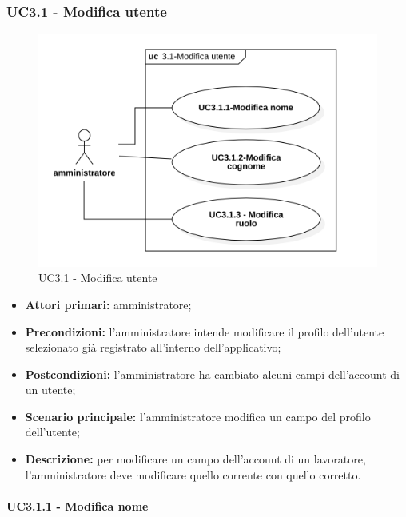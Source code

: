 \subsubsection{UC3.1 - Modifica utente}

\begin{figure}[H]
	\centering
	\includegraphics[scale=0.52]{res/images/uc3-1.png}
	\caption{UC3.1 - Modifica utente}
\end{figure}
\begin{itemize}
	\item 	\textbf{Attori primari:} amministratore;
	\item 	\textbf{Precondizioni:} l'amministratore intende modificare il profilo dell'utente selezionato già registrato all'interno dell'applicativo;
	\item 	\textbf{Postcondizioni:} l'amministratore ha cambiato alcuni campi dell'account di un utente;
	\item 	\textbf{Scenario principale:} l'amministratore modifica un campo del profilo dell'utente;
	\item 	\textbf{Descrizione:} per modificare un campo dell'account di un lavoratore, l'amministratore deve modificare quello corrente con quello corretto.

\end{itemize}

\paragraph{UC3.1.1 - Modifica nome}

